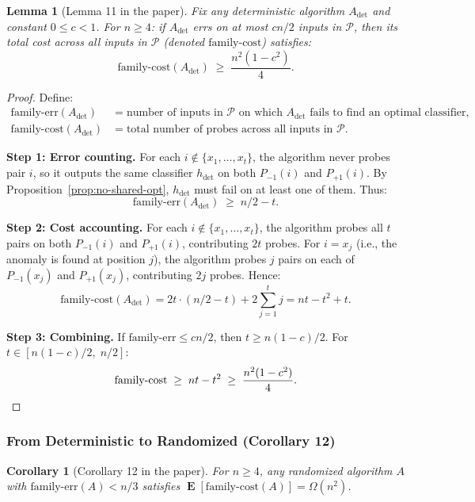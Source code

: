 \documentclass[11pt, a4paper]{article}
\theoremstyle{boxed}
\newtheorem{innerlemma}{Lemma}[section]
\newtheorem{innercorollary}{Corollary}[section]
\newenvironment{lemma}
  {\begin{mdframed}[style=lemstyle]\begin{innerlemma}}
  {\end{innerlemma}\end{mdframed}}
\newenvironment{corollary}
  {\begin{mdframed}[style=thmstyle]\begin{innercorollary}}
  {\end{innercorollary}\end{mdframed}}
\DeclareMathOperator{\E}{\mathbf{E}}
\begin{document}
\begin{lemma}[Lemma 11 in the paper]\label{lem:det-cost}
  Fix any deterministic algorithm $A_\mathrm{det}$ and constant $0 \le c < 1$. For $n \ge 4$: if $A_\mathrm{det}$ errs on at most $cn/2$ inputs in $\mathcal{P}$, then its total cost across all inputs in $\mathcal{P}$ (denoted $\mathrm{family\text{-}cost}$) satisfies:
  \[
    \mathrm{family\text{-}cost}(A_\mathrm{det}) \;\ge\; \frac{n^2(1 - c^2)}{4}.
  \]
\end{lemma}

\begin{proof}
  Define:
  \begin{align*}
    \mathrm{family\text{-}err}(A_\mathrm{det}) &= \text{number of inputs in } \mathcal{P} \text{ on which } A_\mathrm{det} \text{ fails to find an optimal classifier}, \\
    \mathrm{family\text{-}cost}(A_\mathrm{det}) &= \text{total number of probes across all inputs in } \mathcal{P}.
  \end{align*}

  \textbf{Step 1: Error counting.} For each $i \notin \{x_1, \ldots, x_t\}$, the algorithm never probes pair $i$, so it outputs the same classifier $h_\mathrm{det}$ on both $P_{-1}(i)$ and $P_{+1}(i)$. By Proposition~\ref{prop:no-shared-opt}, $h_\mathrm{det}$ must fail on at least one of them. Thus:
  \[
    \mathrm{family\text{-}err}(A_\mathrm{det}) \;\ge\; n/2 - t.
  \]

  \textbf{Step 2: Cost accounting.} For each $i \notin \{x_1, \ldots, x_t\}$, the algorithm probes all $t$ pairs on both $P_{-1}(i)$ and $P_{+1}(i)$, contributing $2t$ probes. For $i = x_j$ (i.e., the anomaly is found at position $j$), the algorithm probes $j$ pairs on each of $P_{-1}(x_j)$ and $P_{+1}(x_j)$, contributing $2j$ probes. Hence:
  \[
    \mathrm{family\text{-}cost}(A_\mathrm{det}) = 2t \cdot (n/2 - t) + 2\sum_{j=1}^{t} j = nt - t^2 + t.
  \]

  \textbf{Step 3: Combining.} If $\mathrm{family\text{-}err} \le cn/2$, then $t \ge n(1-c)/2$. For $t \in [n(1-c)/2, \; n/2]$:
  \[
    \mathrm{family\text{-}cost} \;\ge\; nt - t^2 \;\ge\; \frac{n^2(1 - c^2)}{4}. \qedhere
  \]
\end{proof}

\subsubsection{From Deterministic to Randomized (Corollary 12)}

\begin{corollary}[Corollary 12 in the paper]\label{cor:randomized-lb}
  For $n \ge 4$, any randomized algorithm $A$ with $\mathrm{family\text{-}err}(A) < n/3$ satisfies $\E[\mathrm{family\text{-}cost}(A)] = \Omega(n^2)$.
\end{corollary}
\end{document}
